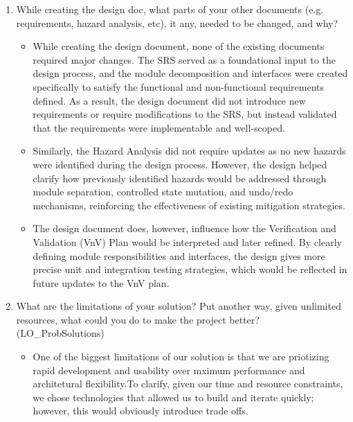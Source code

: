 \documentclass[12pt, titlepage]{article}
\begin{document}
\begin{enumerate}
\begin{itemize}
      \item Some design decisions did not stem directly from stakeholder input but instead
      came from practical constraints and other experiences. For example, user
      interface decisions were informed by common design patterns observed in modern
      drawing and canvas-based applications, helping minimize the learning curve and
      aligning with user expectations. Similarly, the project timeline was
      determined based on course deadlines and workload considerations, rather than
      client input, as these constraints were externally imposed by the course
      structure.
    \end{itemize}
  \item While creating the design doc, what parts of your other documents (e.g.
  requirements, hazard analysis, etc), it any, needed to be changed, and why?
    \begin{itemize}
      \item While creating the design document, none of the existing documents required
      major changes. The SRS served as a foundational input to the design process, and the
      module decomposition and interfaces were created specifically to satisfy the
      functional and non-functional requirements defined. As a result, the design document
      did not introduce new requirements or require modifications to the SRS, but instead
      validated that the requirements were implementable and well-scoped.

      \item Similarly, the Hazard Analysis did not require updates as no new hazards were
      identified during the design process. However, the design helped clarify how
      previously identified hazards would be addressed through module separation,
      controlled state mutation, and undo/redo mechanisms, reinforcing the effectiveness
      of existing mitigation strategies.

      \item The design document does, however, influence how the Verification and Validation
      (VnV) Plan would be interpreted and later refined. By clearly defining module
      responsibilities and interfaces, the design gives more precise unit and integration
      testing strategies, which would be reflected in future updates to the VnV plan.

    \end{itemize}
  \item What are the limitations of your solution?  Put another way, given
  unlimited resources, what could you do to make the project better? (LO\_ProbSolutions)
    \begin{itemize}
      \item One of the biggest limitations of our solution is that we are
      priotizing rapid development and usability over mximum performance
      and architetural flexibility.To clarify, given our time and
      resource constraints, we chose technologies that
      allowed us to build and iterate quickly; however, this
      would obviously introduce trade offs.


\end{itemize}
\end{enumerate}
\end{document}
